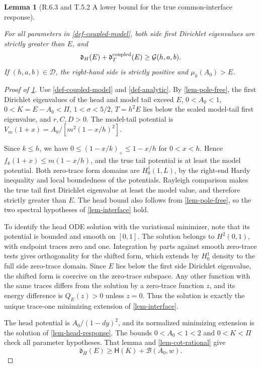 \documentclass[11pt,a4paper]{article}
\theoremstyle{proofmanuscript}
\newtheorem{lemma}[theorem]{Lemma}
\begin{document}
\begin{lemma}[R.6.3 and T.5.2 A lower bound for the true common-interface response]\label{lem-coupled-response-lower-bound}

For all parameters in \ref{def-coupled-model}, both side first Dirichlet eigenvalues are strictly greater than \(E\), and \[
\mathfrak d_H(E)+\mathfrak d_T^{\rm coupled}(E)\ge\mathcal G(h,a,b).
\] If \((h,a,b)\in\mathcal D\), the right-hand side is strictly positive and \(\mu_k(A_0)>E\).

\end{lemma}

\begin{proof}[Proof of \ref{lem-coupled-response-lower-bound}]

Use \ref{def-coupled-model} and \ref{def-analytic}. By \ref{lem-pole-free}, the first Dirichlet eigenvalues of the head and model tail exceed \(E\), \(0<A_0<1\), \(0<K=E-A_0<\Pi\), \(1<\sigma<5/2\), \(T=h^2E\) lies below the scaled model-tail first eigenvalue, and \(r,C,D>0\). The model-tail potential is \(V_m(1+x)=A_0/[m^2(1-x/h)^2]\).

Since \(k\le h\), we have \(0\le(1-x/k)_+\le1-x/h\) for \(0<x<h\). Hence \(f_k(1+x)\le m(1-x/h)\), and the true tail potential is at least the model potential. Both zero-trace form domains are \(H_0^1(1,L)\), by the right-end Hardy inequality and local boundedness of the potentials. Rayleigh comparison makes the true tail first Dirichlet eigenvalue at least the model value, and therefore strictly greater than \(E\). The head bound also follows from \ref{lem-pole-free}, so the two spectral hypotheses of \ref{lem-interface} hold.

To identify the head ODE solution with the variational minimizer, note that its potential is bounded and smooth on \([0,1]\). The solution belongs to \(H^2(0,1)\), with endpoint traces zero and one. Integration by parts against smooth zero-trace tests gives orthogonality for the shifted form, which extends by \(H_0^1\) density to the full side zero-trace domain. Since \(E\) lies below the first side Dirichlet eigenvalue, the shifted form is coercive on the zero-trace subspace. Any other function with the same traces differs from the solution by a zero-trace function \(z\), and its energy difference is \(Q_E(z)>0\) unless \(z=0\). Thus the solution is exactly the unique trace-one minimizing extension of \ref{lem-interface}.

The head potential is \(A_0/(1-dy)^2\), and its normalized minimizing extension is the solution of \ref{lem-head-response}. The bounds \(0<A_0<1<2\) and \(0<K<\Pi\) check all parameter hypotheses. That lemma and \ref{lem-cot-rational} give \[
\mathfrak d_H(E)\ge\mathsf H(K)+\mathcal B(A_0,w).
\]


\end{proof}
\end{document}
